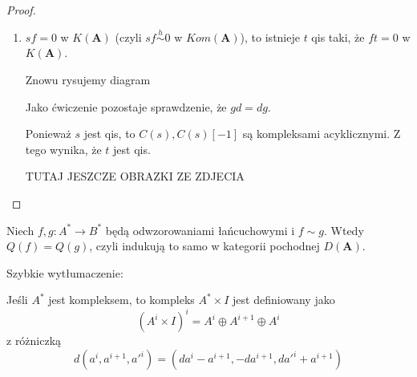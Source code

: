 \begin{proof}
\begin{enumerate}
      \item $sf=0$ w $K(\mathbf{A})$ (czyli $sf\overset{h}{\sim} 0$ w $Kom(\mathbf{A})$), to istnieje $t$ qis taki, że $ft=0$ w $K(\mathbf{A})$.

        Znowu rysujemy diagram 
        \begin{center}\end{center}

        Jako ćwiczenie pozostaje sprawdzenie, że $gd=dg$.

        Ponieważ $s$ jest qis, to $C(s), C(s)[-1]$ są kompleksami acyklicznymi. Z tego wynika, że $t$ jest qis. 

        {\large\color{red}TUTAJ JESZCZE OBRAZKI ZE ZDJECIA}
  \end{enumerate}
\end{proof}

\begin{lemma}
  Niech $f,g:A^*\to B^*$ będą odwzorowaniami łańcuchowymi i $f\sim g$. Wtedy $Q(f)=Q(g)$, czyli indukują to samo w kategorii pochodnej $D(\mathbf{A})$.
\end{lemma}

Szybkie wytłumaczenie:
\begin{center}\end{center}

\begin{definition}
  Jeśli $A^*$ jest kompleksem, to kompleks $A^*\times I$ jest definiowany jako 
  $$(A^i\times I)^i=A^i\oplus A^{i+1}\oplus A^i$$
  z różniczką
  $$d(a^i, a^{i+1}, a'^i)=(da^i-a^{i+1}, -da^{i+1}, da'^i+a^{i+1})$$
\end{definition}

